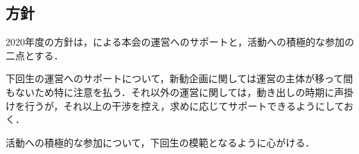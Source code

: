 \subsection*{\newGradeIfKouki{}\thirdGrade{}方針}




2020年度の\newGradeIfKouki{}\thirdGrade{}方針は，\newGradeIfKouki{}\secondGrade{}による本会の運営へのサポートと，活動への積極的な参加の二点とする．

下回生の運営へのサポートについて，新勧企画に関しては運営の主体が移って間もないため特に注意を払う．それ以外の運営に関しては，動き出しの時期に声掛けを行うが，それ以上の干渉を控え，求めに応じてサポートできるようにしておく．

活動への積極的な参加について，下回生の模範となるように心がける．